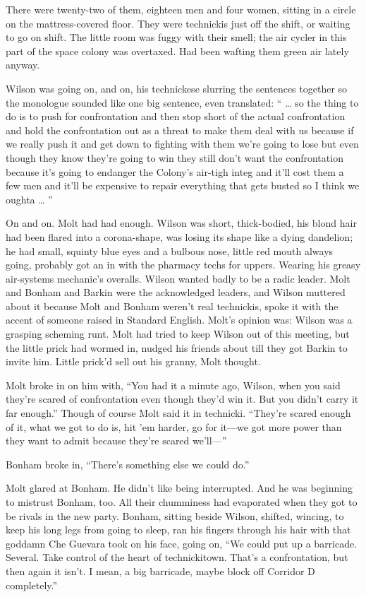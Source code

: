 There were twenty-two of them, eighteen men and four women, sitting in a circle on the mattress-covered floor. They were technickis just off the shift, or waiting to go on shift. The little room was fuggy with their smell; the air cycler in this part of the space colony was overtaxed. Had been wafting them green air lately anyway.

Wilson was going on, and on, his technickese slurring the sentences together so the monologue sounded like one big sentence, even translated: “ … so the thing to do is to push for confrontation and then stop short of the actual confrontation and hold the confrontation out as a threat to make them deal with us because if we really push it and get down to fighting with them we’re going to lose but even though they know they’re going to win they still don’t want the confrontation because it’s going to endanger the Colony’s air-tigh integ and it’ll cost them a few men and it’ll be expensive to repair everything that gets busted so I think we oughta … ”

On and on. Molt had had enough. Wilson was short, thick-bodied, his blond hair had been flared into a corona-shape, was losing its shape like a dying dandelion; he had small, squinty blue eyes and a bulbous nose, little red mouth always going, probably got an in with the pharmacy techs for uppers. Wearing his greasy air-systems mechanic’s overalls. Wilson wanted badly to be a radic leader. Molt and Bonham and Barkin were the acknowledged leaders, and Wilson muttered about it because Molt and Bonham weren’t real technickis, spoke it with the accent of someone raised in Standard English. Molt’s opinion was: Wilson was a grasping scheming runt. Molt had tried to keep Wilson out of this meeting, but the little prick had wormed in, nudged his friends about till they got Barkin to invite him. Little prick’d sell out his granny, Molt thought.

Molt broke in on him with, “You had it a minute ago, Wilson, when you said they’re scared of confrontation even though they’d win it. But you didn’t carry it far enough.” Though of course Molt said it in technicki. “They’re scared enough of it, what we got to do is, hit ’em harder, go for it—we got more power than they want to admit because they’re scared we’ll—”

Bonham broke in, “There’s something else we could do.”

Molt glared at Bonham. He didn’t like being interrupted. And he was beginning to mistrust Bonham, too. All their chumminess had evaporated when they got to be rivals in the new party. Bonham, sitting beside Wilson, shifted, wincing, to keep his long legs from going to sleep, ran his fingers through his hair with that goddamn Che Guevara took on his face, going on, “We could put up a barricade. Several. Take control of the heart of technickitown. That’s a confrontation, but then again it isn’t. I mean, a big barricade, maybe block off Corridor D completely.”

